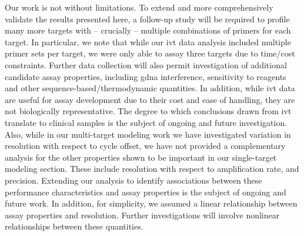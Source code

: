 \documentclass[../thesis.tex]{subfiles}
\begin{document}
Our work is not without limitations. To extend and more comprehensively validate the results presented here, a follow-up study will be required to profile many more targets with -- crucially -- multiple combinations of primers for each target. In particular, we note that while our \gls{ivt}  data analysis included multiple primer sets per target, we were only able to assay three targets due to time/cost constraints. Further data collection will also permit investigation of additional candidate assay properties, including \gls{gdna} interference, sensitivity to reagents and other sequence-based/thermodynamic quantities. In addition, while \gls{ivt}  data are useful for assay development due to their cost and ease of handling, they are not biologically representative. The degree to which conclusions drawn from \gls{ivt}  translate to  clinical samples is the subject of ongoing and future investigation. Also, while in our multi-target modeling work we have investigated variation in resolution with respect to cycle offset, we have not provided a complementary analysis for the other properties shown to be important in our single-target modeling section. These include resolution with respect to amplification rate, and precision. Extending our analysis to identify associations between these performance characteristics and assay properties is the subject of ongoing and future work. In addition, for simplicity, we assumed a linear relationship between assay properties and resolution. Further investigations will involve nonlinear relationships between these quantities.


\end{document}
